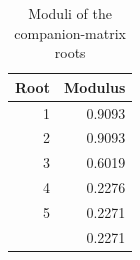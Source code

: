 \begin{table}

\caption{\label{tab:stability}Moduli of the companion-matrix roots}
\centering
\begin{tabular}[t]{rr}
\toprule
Root & Modulus\\
\midrule
1 & 0.9093\\
2 & 0.9093\\
3 & 0.6019\\
4 & 0.2276\\
5 & 0.2271\\
\addlinespace
6 & 0.2271\\
\bottomrule
\end{tabular}
\end{table}
